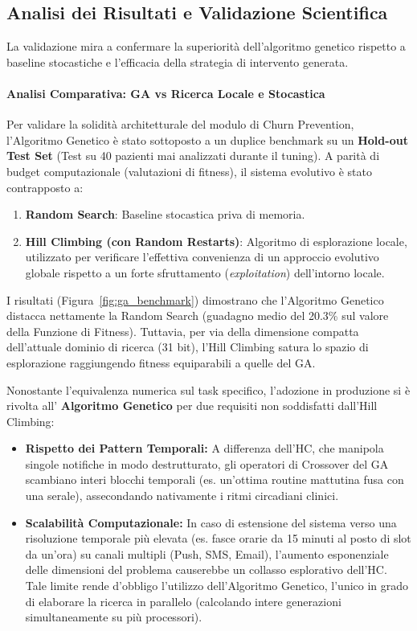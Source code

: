 \subsection{Analisi dei Risultati e Validazione Scientifica}
\label{sec:validation}

La validazione mira a confermare la superiorità dell'algoritmo genetico rispetto a baseline stocastiche e l'efficacia della strategia di intervento generata.

\paragraph{Analisi Comparativa: GA vs Ricerca Locale e Stocastica}
Per validare la solidità architetturale del modulo di Churn Prevention, l'Algoritmo Genetico è stato sottoposto a un duplice benchmark su un \textbf{Hold-out Test Set} (Test su 40 pazienti mai analizzati durante il tuning). A parità di budget computazionale (valutazioni di fitness), il sistema evolutivo è stato contrapposto a:
\begin{enumerate}
    \item \textbf{Random Search}: Baseline stocastica priva di memoria.
    \item \textbf{Hill Climbing (con Random Restarts)}: Algoritmo di esplorazione locale, utilizzato per verificare l'effettiva convenienza di un approccio evolutivo globale rispetto a un forte sfruttamento (\textit{exploitation}) dell'intorno locale.
\end{enumerate}

I risultati (Figura~\ref{fig:ga_benchmark}) dimostrano che l'Algoritmo Genetico distacca nettamente la Random Search (guadagno medio del 20.3\% sul valore della Funzione di Fitness). Tuttavia, per via  della dimensione compatta dell'attuale dominio di ricerca (31 bit), l'Hill Climbing satura lo spazio di esplorazione raggiungendo fitness equiparabili a quelle del GA.

Nonostante l'equivalenza numerica sul task specifico, l'adozione in produzione si è rivolta all' \textbf{Algoritmo Genetico} per due requisiti non soddisfatti dall'Hill Climbing:
\begin{itemize}
    \item \textbf{Rispetto dei Pattern Temporali:} A differenza dell'HC, che manipola singole notifiche in modo destrutturato, gli operatori di Crossover del GA scambiano interi blocchi temporali (es. un'ottima routine mattutina fusa con una serale), assecondando nativamente i ritmi circadiani clinici.
    \item \textbf{Scalabilità Computazionale:} In caso di estensione del sistema verso una risoluzione temporale più elevata (es. fasce orarie da 15 minuti al posto di slot da un'ora) su canali multipli (Push, SMS, Email), l'aumento esponenziale delle dimensioni del problema causerebbe un collasso esplorativo dell'HC. Tale limite rende d'obbligo l'utilizzo dell'Algoritmo Genetico, l'unico in grado di elaborare la ricerca in parallelo (calcolando intere generazioni simultaneamente su più processori).
\end{itemize}

